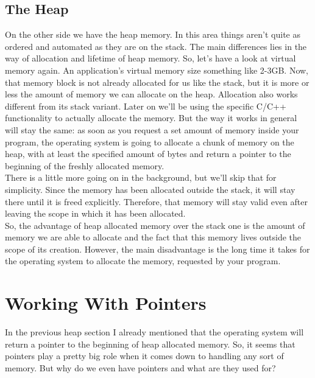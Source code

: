 \documentclass{article}
\begin{document}
  \subsection{The Heap}
  On the other side we have the heap memory.
  In this area things aren't quite as ordered and automated as they are on the stack.
  The main differences lies in the way of allocation and lifetime of heap memory.
  So, let's have a look at virtual memory again.
  An application's virtual memory size something like 2-3GB.
  Now, that memory block is not already allocated for us like the stack, but it is more or less the amount of memory we can allocate on the heap.
  Allocation also works different from its stack variant.
  Later on we'll be using the specific C/C++ functionality to actually allocate the memory.
  But the way it works in general will stay the same: as soon as you request a set amount of memory inside your program, the operating system is going to allocate a chunk of memory on the heap, with at least the specified amount of bytes and return a pointer to the beginning of the freshly allocated memory.
  \\There is a little more going on in the background, but we'll skip that for simplicity.
  Since the memory has been allocated outside the stack, it will stay there until it is freed explicitly.
  Therefore, that memory will stay valid even after leaving the scope in which it has been allocated.
  \\So, the advantage of heap allocated memory over the stack one is the amount of memory we are able to allocate and the fact that this memory lives outside the scope of its creation.
  However, the main disadvantage is the long time it takes for the operating system to allocate the memory, requested by your program.
  \section{Working With Pointers}
  In the previous heap section I already mentioned that the operating system will return a pointer to the beginning of heap allocated memory.
  So, it seems that pointers play a pretty big role when it comes down to handling any sort of memory.
  But why do we even have pointers and what are they used for?
\end{document}
